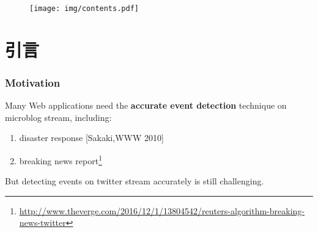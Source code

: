 \begin{frame}[plain]
\begin{figure}
    \texttt{[image: img/contents.pdf]}
    \label{fig:modelUMIETM}
\end{figure}

\end{frame}

\section{引言}
\begin{frame}
\frametitle{Motivation}

Many Web applications need the \textbf{accurate event detection} technique on microblog stream, including:
\begin{enumerate}
	\item disaster response [Sakaki,WWW 2010]
	\item breaking news report\footnote{\url{http://www.theverge.com/2016/12/1/13804542/reuters-algorithm-breaking-news-twitter}}
\end{enumerate}	
\vfill

But detecting events on twitter stream accurately is still challenging.
\end{frame}

